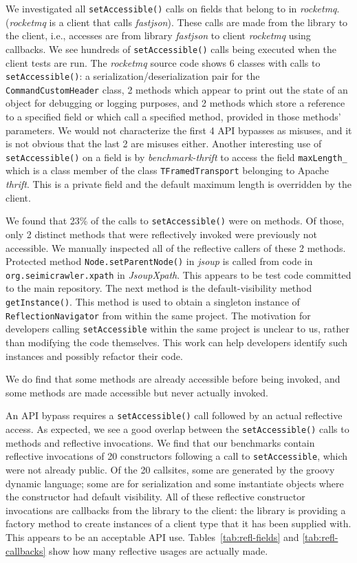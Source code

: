 We investigated all \texttt{setAccessible()} calls on fields that belong to in \emph{rocketmq}. (\emph{rocketmq} is a client that calls \emph{fastjson}). These calls are made from the library to the client, i.e., accesses are from library \emph{fastjson} to client \emph{rocketmq} using callbacks. We see hundreds of \texttt{setAccessible()} calls being executed when the client tests are run. The \emph{rocketmq} source code shows 6 classes with calls to \texttt{setAccessible()}: a serialization/deserialization pair for the \texttt{CommandCustomHeader} class, 2 methods which appear to print out the state of an object for debugging or logging purposes, and 2 methods which store a reference to a specified field or which call a specified method, provided in those methods' parameters. We would not characterize the first 4 API bypasses as misuses, and it is not obvious that the last 2 are misuses either. Another interesting use of \texttt{setAccessible()} on a field is by \emph{benchmark-thrift} to access the field \texttt{maxLength\_}  which is a class member of the class \texttt{TFramedTransport} belonging to Apache \emph{thrift}. This is a private field and the default maximum length is overridden by the client.

We found that 23\% of the calls to \texttt{setAccessible()} were on methods. Of those, only 2 distinct methods that were reflectively invoked were previously not accessible. We manually inspected all of the reflective callers of these 2 methods. Protected method \texttt{Node.setParentNode()} in \emph{jsoup} is called from code in \texttt{org.seimicrawler.xpath} in \emph{JsoupXpath}. This appears to be test code committed to the main repository. The next method is the default-visibility method \texttt{getInstance()}. This method is used to obtain a singleton instance of {\tt ReflectionNavigator} from within the same project. The motivation for developers calling \texttt{setAccessible} within the same project is unclear to us, rather than modifying the code themselves. This work can help developers identify such instances and possibly refactor their code.

We do find that some methods are already accessible before being invoked, and some methods are made accessible but never actually invoked.

An API bypass requires a \texttt{setAccessible()} call followed by an
actual reflective access.  As expected, we see a good overlap between the
\texttt{setAccessible()} calls to methods and reflective invocations.
We find that our benchmarks contain reflective invocations of 20 constructors following a call to \texttt{setAccessible}, which were not already public. Of the 20 callsites, some are generated by the
groovy dynamic language; some are for serialization and some instantiate objects where the constructor had default visibility. All of these reflective constructor invocations are callbacks from the library to the client: the library is providing a factory method to create instances of a client type that it has been supplied with. This appears to be an acceptable API use.
Tables~\ref{tab:refl-fields} and \ref{tab:refl-callbacks} show how many reflective usages are actually made.

